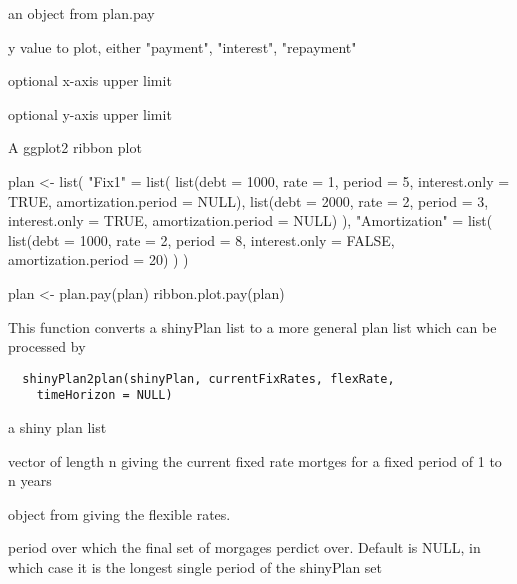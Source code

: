 \documentclass[a4paper]{book}
\begin{document}
%
\begin{Arguments}
\begin{ldescription}
\item[\code{pay}] an object from plan.pay

\item[\code{y}] y value to plot, either "payment", "interest",
"repayment"

\item[\code{xmax}] optional x-axis upper limit

\item[\code{ymax}] optional y-axis upper limit
\end{ldescription}
\end{Arguments}
%
\begin{Value}
A ggplot2 ribbon plot
\end{Value}
%
\begin{Examples}
\begin{ExampleCode}
plan <- list(
 "Fix1" = list(
   list(debt = 1000, rate = 1, period = 5, interest.only = TRUE, amortization.period = NULL),
   list(debt = 2000, rate = 2, period = 3, interest.only = TRUE, amortization.period = NULL)
 ),
 "Amortization" = list(
   list(debt = 1000, rate = 2, period = 8, interest.only = FALSE, amortization.period = 20)
 )
)

plan <- plan.pay(plan)
ribbon.plot.pay(plan)
\end{ExampleCode}
\end{Examples}
%
\begin{Description}\relax
This function converts a shinyPlan list to a more general
plan list which can be processed by
\end{Description}
%
\begin{Usage}
\begin{verbatim}
  shinyPlan2plan(shinyPlan, currentFixRates, flexRate,
    timeHorizon = NULL)
\end{verbatim}
\end{Usage}
%
\begin{Arguments}
\begin{ldescription}
\item[\code{shinyPlan}] a shiny plan list

\item[\code{currentFixRates}] vector of length n giving the
current fixed rate mortges for a fixed period of 1 to n
years

\item[\code{flexRate}] object from 
giving the flexible rates.

\item[\code{timeHorizon}] period over which the final set of
morgages perdict over. Default is NULL, in which case it
is the longest single period of the shinyPlan set
\end{ldescription}
\end{Arguments}
\end{document}

